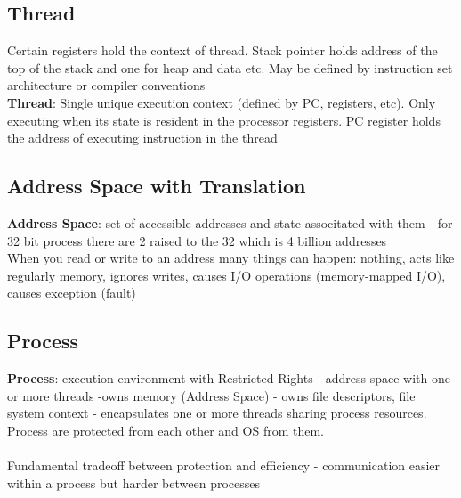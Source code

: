 \documentclass{article}
\begin{document}
\subsection{Thread}
Certain registers hold the context of thread. Stack pointer holds address of the top of the stack and one for heap and data etc. May be defined by instruction set architecture or compiler conventions \\ 
\textbf{Thread}: Single unique execution context (defined by PC, registers, etc). Only executing when its state is resident in the processor registers. PC register holds the address of executing instruction in the thread 
\subsection{Address Space with Translation}
\textbf{Address Space}: set of accessible addresses and state associtated with them - for 32 bit process there are 2 raised to the 32 which is 4 billion addresses \\ 
When you read or write to an address many things can happen: nothing, acts like regularly memory, ignores writes, causes I/O operations (memory-mapped I/O), causes exception (fault)
\subsection{Process}
\textbf{Process}: execution environment with Restricted Rights - address space with one or more threads -owns memory (Address Space) - owns file descriptors, file system context - encapsulates one or more threads sharing process resources. Process are protected from each other and OS from them. \\ \\ 
Fundamental tradeoff between protection and efficiency - communication easier within a process but harder between processes
\end{document}

